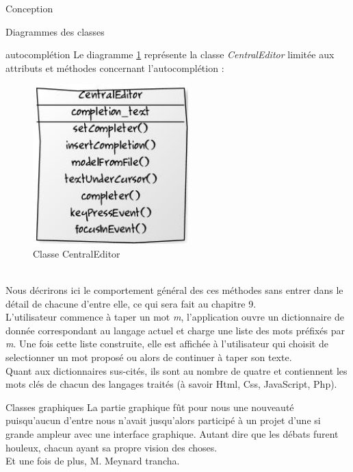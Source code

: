 \documentclass[a4paper, 12pt]{report}
\begin{document}
\begin{part}{Conception}
\begin{chapter}{Diagrammes des classes}
\begin{section}{\Gls{autocomplétion}}
				Le diagramme \ref{orangina} représente la classe \emph{CentralEditor} limitée aux attributs et méthodes concernant
				l'\gls{autocomplétion} :
				\begin{figure}[ht]
					\begin{center}
						\includegraphics[width=6cm]{images/classesAutoCompletion.jpg}
						\caption{Classe CentralEditor}
						\label{orangina}
					\end{center}
				\end{figure}~\\

				Nous décrirons ici le comportement général des ces méthodes sans entrer dans le détail de chacune d'entre elle,
				ce qui sera fait au chapitre 9.\\

				L'utilisateur commence à taper un mot \emph{m}, l'application ouvre un dictionnaire de donnée correspondant au langage actuel et 
				charge une liste des mots préfixés par \emph{m}. Une fois cette liste construite, elle est affichée à l'utilisateur qui choisit de
				selectionner un mot proposé ou alors de continuer à taper son texte.\\

				Quant aux dictionnaires sus-cités, ils sont au nombre de quatre et contiennent les mots clés de chacun des langages traités (à savoir
				\gls{Html}, \gls{Css}, \gls{JavaScript}, \gls{Php}).
			\end{section}
			\begin{section}{Classes graphiques}
				La partie graphique fût pour nous une nouveauté puisqu'aucun d'entre nous n'avait jusqu'alors participé à un projet d'une si grande
				ampleur avec une interface graphique. Autant dire que les débats furent houleux, chacun ayant sa propre vision des choses.\\
				Et une fois de plus, M. Meynard trancha.\\


\end{section}
\end{chapter}
\end{part}
\end{document}
